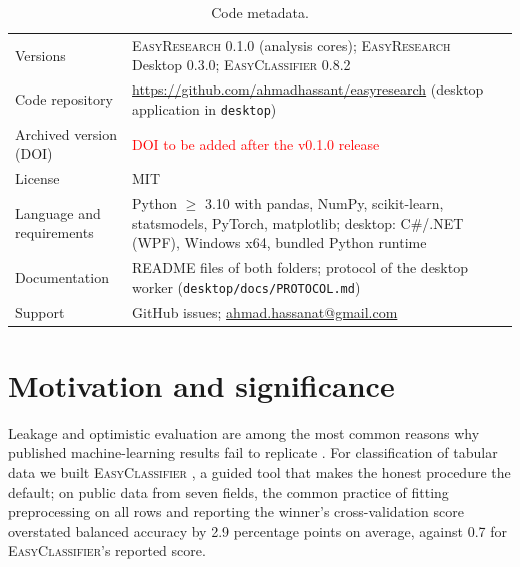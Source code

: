 \documentclass[11pt,a4paper]{article}
\newcommand{\ER}{\textsc{EasyResearch}}
\newcommand{\EC}{\textsc{EasyClassifier}}
\newcommand{\TBDDOI}{\textcolor{red}{DOI to be added after the v0.1.0 release}}
\begin{document}
\begin{table}[h]
\centering\small
\caption{Code metadata.}
\label{tab:metadata}
\begin{tabularx}{\linewidth}{@{}lX@{}}
\toprule
Versions & \ER{} 0.1.0 (analysis cores); \ER{} Desktop 0.3.0; \EC{} 0.8.2 \\
Code repository & \url{https://github.com/ahmadhassant/easyresearch} (desktop application in \texttt{desktop}) \\
Archived version (DOI) & \TBDDOI \\
License & MIT \\
Language and requirements & Python $\geq$ 3.10 with pandas, NumPy, scikit-learn, statsmodels, PyTorch, matplotlib; desktop: C\#/.NET (WPF), Windows x64, bundled Python runtime \\
Documentation & README files of both folders; protocol of the desktop worker (\texttt{desktop/docs/PROTOCOL.md}) \\
Support & GitHub issues; \href{mailto:ahmad.hassanat@gmail.com}{ahmad.hassanat@gmail.com} \\
\bottomrule
\end{tabularx}
\end{table}

\section{Motivation and significance}
\label{sec:motivation}

Leakage and optimistic evaluation are among the most common reasons why published machine-learning results fail to replicate \citep{kapoor2023leakage,lones2021pitfalls}. For classification of tabular data we built \EC{} \citep{hassanat2026easyclassifierpaper}, a guided tool that makes the honest procedure the default; on public data from seven fields, the common practice of fitting preprocessing on all rows and reporting the winner's cross-validation score overstated balanced accuracy by 2.9 percentage points on average, against 0.7 for \EC's reported score.
\end{document}
